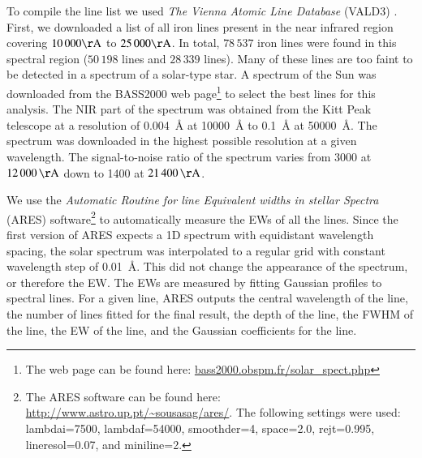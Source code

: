 \documentclass{aa}
\begin{document}
To compile the line list we used \emph{The Vienna Atomic Line Database} (VALD3) \citep{VALD1,VALD2}.
First, we downloaded a list of all iron lines present in the near
infrared region covering $10\,000\si{\AA}$ to $25\,000\si{\AA}$.
In total, $78\,537$ iron lines were found in this spectral region
($50\,198$  lines and $28\,339$  lines).
Many of these lines are too faint to be detected in a spectrum
of a solar-type star. A spectrum of the Sun was downloaded from
the BASS2000 web page\footnote{The web page can be found here:
\url{bass2000.obspm.fr/solar_spect.php}} to select the best lines
for this analysis. The NIR part of the spectrum was obtained from
the Kitt Peak telescope \citep{Hinkle1995} at a resolution of
\SI{0.004}{\angstrom} at \SI{10000}{\angstrom} to \SI{0.1}{\angstrom}
at \SI{50000}{\angstrom}. The spectrum was downloaded in the highest
possible resolution at a given wavelength. The signal-to-noise ratio
of the spectrum varies from 3000 at $\SI{12000}{\AA}$ down to 1400 at
$\SI{21400}{\AA}$.

We use the \emph{Automatic Routine for line Equivalent widths in stellar Spectra} (ARES) software\footnote{The ARES software can be found
here: \url{http://www.astro.up.pt/~sousasag/ares/}. The following
settings were used: lambdai=7500, lambdaf=54000, smoothder=4, space=2.0,
rejt=0.995, lineresol=0.07, and miniline=2.}\citep{Sousa2007,Sousa2015a}
to automatically measure the EWs of all the lines. Since the first
version of ARES expects a 1D spectrum with equidistant wavelength
spacing, the solar spectrum was interpolated to a regular grid with
constant wavelength step of \SI{0.01}{\angstrom}. This did not change
the appearance of the spectrum, or therefore the EW. The EWs are
measured by fitting Gaussian profiles to spectral lines. For a given
line, ARES outputs the central wavelength of the line, the number of
lines fitted for the final result, the depth of the line, the FWHM of
the line, the EW of the line, and the Gaussian coefficients for the
line.
\end{document}
